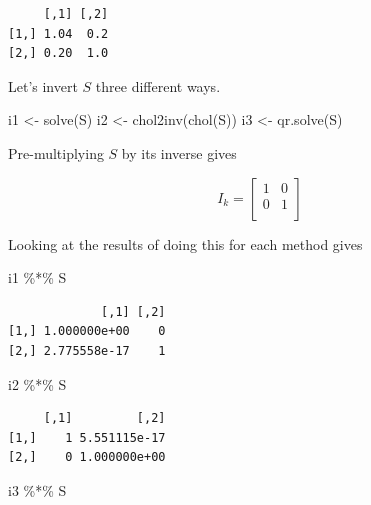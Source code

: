 \documentclass[
  letterpaper,
]{book}
\newenvironment{Shaded}{\begin{snugshade}}{\end{snugshade}}
\newcommand{\FunctionTok}[1]{\textcolor[rgb]{0.28,0.35,0.67}{#1}}
\newcommand{\NormalTok}[1]{\textcolor[rgb]{0.00,0.23,0.31}{#1}}
\newcommand{\OtherTok}[1]{\textcolor[rgb]{0.00,0.23,0.31}{#1}}
\newcommand{\SpecialCharTok}[1]{\textcolor[rgb]{0.37,0.37,0.37}{#1}}
\begin{document}
\begin{verbatim}
     [,1] [,2]
[1,] 1.04  0.2
[2,] 0.20  1.0
\end{verbatim}

Let's invert \(S\) three different ways.

\begin{Shaded}
\begin{Highlighting}[]
\NormalTok{i1 }\OtherTok{\textless{}{-}} \FunctionTok{solve}\NormalTok{(S) }
\NormalTok{i2 }\OtherTok{\textless{}{-}} \FunctionTok{chol2inv}\NormalTok{(}\FunctionTok{chol}\NormalTok{(S))}
\NormalTok{i3 }\OtherTok{\textless{}{-}} \FunctionTok{qr.solve}\NormalTok{(S) }
\end{Highlighting}
\end{Shaded}

Pre-multiplying \(S\) by its inverse gives

\begin{equation}
   I_k = \left[\begin{matrix}1 &0 \\0 &1 \\\end{matrix}\right]
\end{equation}

Looking at the results of doing this for each method gives

\begin{Shaded}
\begin{Highlighting}[]
\NormalTok{i1 }\SpecialCharTok{\%*\%}\NormalTok{ S}
\end{Highlighting}
\end{Shaded}

\begin{verbatim}
             [,1] [,2]
[1,] 1.000000e+00    0
[2,] 2.775558e-17    1
\end{verbatim}

\begin{Shaded}
\begin{Highlighting}[]
\NormalTok{i2 }\SpecialCharTok{\%*\%}\NormalTok{ S}
\end{Highlighting}
\end{Shaded}

\begin{verbatim}
     [,1]         [,2]
[1,]    1 5.551115e-17
[2,]    0 1.000000e+00
\end{verbatim}

\begin{Shaded}
\begin{Highlighting}[]
\NormalTok{i3 }\SpecialCharTok{\%*\%}\NormalTok{ S}
\end{Highlighting}
\end{Shaded}
\end{document}

